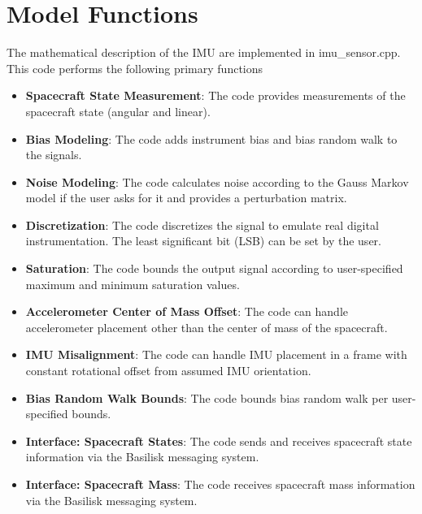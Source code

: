 \section{Model Functions}
The mathematical description of the IMU are implemented in imu\_sensor.cpp. This code performs the following primary functions
\begin{itemize}
	\item \textbf{Spacecraft State Measurement}: The code provides measurements of the spacecraft state (angular and linear).
	\item \textbf{Bias Modeling}: The code adds instrument bias and bias random walk to the signals.
	\item \textbf{Noise Modeling}: The code calculates noise according to the Gauss Markov model if the user asks for it and provides a perturbation matrix.
	\item \textbf{Discretization}: The code discretizes the signal to emulate real digital instrumentation. The least significant bit (LSB) can be set by the user.
	\item \textbf{Saturation}: The code bounds the output signal according to user-specified maximum and minimum saturation values.
	\item \textbf{Accelerometer Center of Mass Offset}: The code can handle accelerometer placement other than the center of mass of the spacecraft.
	\item \textbf{IMU Misalignment}: The code can handle IMU placement in a frame with constant rotational offset from assumed IMU orientation.
	\item \textbf{Bias Random Walk Bounds}: The code bounds bias random walk per user-specified bounds.
	\item \textbf{Interface: Spacecraft States}: The code sends and receives spacecraft state information via the Basilisk messaging system.
	\item \textbf{Interface: Spacecraft Mass}: The code receives spacecraft mass information via the Basilisk messaging system.
\end{itemize}
